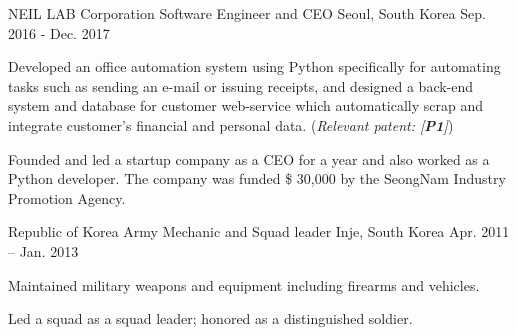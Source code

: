 


\begin{cventries}

\cventry
{NEIL LAB Corporation} %
{Software Engineer and CEO} %
{Seoul, South Korea} %
{Sep. 2016 - Dec. 2017} %
{ %
\begin{cvitems}
\item {Developed an office automation system using Python specifically for automating tasks such as sending an e-mail or issuing receipts, and designed a back-end system and database for customer web-service which automatically scrap and integrate customer's financial and personal data. (\textit{Relevant patent: [\textbf{P1}]})}
\item {Founded and led a startup company as a CEO for a year and also worked as a Python developer. The company was funded \$ 30,000 by the SeongNam Industry Promotion Agency.}
\end{cvitems}
}

\cventry
{Republic of Korea Army} %
{Mechanic and Squad leader} %
{Inje, South Korea} %
{Apr. 2011 – Jan. 2013} %
{ %
\begin{cvitems}
\item {Maintained military weapons and equipment including firearms and vehicles.}
\item {Led a squad as a squad leader; honored as a distinguished soldier.}
\end{cvitems}
}


\end{cventries}
